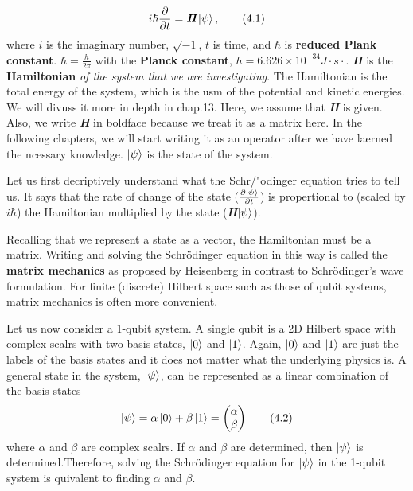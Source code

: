 \documentclass{article}
\begin{document}
\begin{equation} \label{eq 4.1}
    i\hbar\frac{\partial}{\partial t}= \textit{\textbf{H}}\ket{\psi},\tag{4.1}
\end{equation}
where $i$ is the imaginary number, $\sqrt{-1}$, $t$ is time, and $\hbar$
is \textbf{reduced Plank constant}. $\hbar=\frac{h}{2\pi}$ with the \textbf{Planck constant}, $h=6.626\times10^{-34}J\cdot s \cdot$. \textit{\textbf{H}}
is the \textbf{Hamiltonian} \textit{of the system that we are investigating}. 
The Hamiltonian is the total energy of the system, which is the usm of the potential and kinetic energies.
We will divuss it more in depth in chap.13. Here, we assume that \textit{\textbf{H}} is given.
Also, we write \textit{\textbf{H}} in boldface because we treat it as a matrix here.
In the following chapters, we will start writing it as an operator after we have laerned the ncessary knowledge.
$\ket{\psi}$ is the state of the system.

Let us first decriptively understand what the Schr/"{o}dinger equation tries to tell us.
It says that the rate of change of the state ($\frac{\partial\ket{\psi}}{\partial t}$) is propertional to (scaled by $i\hbar$)
the Hamiltonian multiplied by the state (\textbf{\textit{H}}$\ket{\psi}$).

Recalling that we represent a state as a vector, the Hamiltonian must be a matrix.
Writing and solving the Schr\"{o}dinger equation in this way is called the \textbf{matrix mechanics} as
proposed by Heisenberg in contrast to Schr\"{o}dinger's wave formulation. For finite (discrete) Hilbert space such
as those of qubit systems, matrix mechanics is often more convenient.

Let us now consider a 1-qubit system. A single qubit is a 2D Hilbert space with complex scalrs with 
two basis states, $\ket{0}$ and $\ket{1}$. Again,  $\ket{0}$ and $\ket{1}$ are just the
labels of the basis states and it does not matter what the underlying physics is.
A general state in the system, $\ket{\psi}$, can be represented as a linear combination
of the basis states
\begin{equation} \label{eq 4.2}
    \ket{\psi} = \alpha\ket{0}+\beta\ket{1}=\begin{pmatrix}
        \alpha \\ \beta
    \end{pmatrix} \tag{4.2}
\end{equation}
where $\alpha$ and $\beta$ are complex scalrs. If $\alpha$ and $\beta$ are determined, then
$\ket{\psi}$ is determined.Therefore, solving the Schr\"{o}dinger equation for $\ket{\psi}$ in the
1-qubit system is quivalent to finding $\alpha$ and $\beta$.
\end{document}
